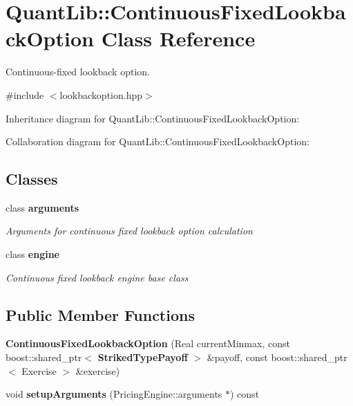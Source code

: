 \section{Quant\+Lib\+:\+:Continuous\+Fixed\+Lookback\+Option Class Reference}
\label{class_quant_lib_1_1_continuous_fixed_lookback_option}


Continuous-\/fixed lookback option.  




{\ttfamily \#include $<$lookbackoption.\+hpp$>$}



Inheritance diagram for Quant\+Lib\+:\+:Continuous\+Fixed\+Lookback\+Option\+:


Collaboration diagram for Quant\+Lib\+:\+:Continuous\+Fixed\+Lookback\+Option\+:
\subsection*{Classes}
\begin{DoxyCompactItemize}
\item 
class {\bf arguments}
\begin{DoxyCompactList}\small\item\em Arguments for continuous fixed lookback option calculation \end{DoxyCompactList}\item 
class {\bf engine}
\begin{DoxyCompactList}\small\item\em Continuous fixed lookback engine base class \end{DoxyCompactList}\end{DoxyCompactItemize}
\subsection*{Public Member Functions}
\begin{DoxyCompactItemize}
\item 
{\bfseries Continuous\+Fixed\+Lookback\+Option} (Real current\+Minmax, const boost\+::shared\+\_\+ptr$<$ {\bf Striked\+Type\+Payoff} $>$ \&payoff, const boost\+::shared\+\_\+ptr$<$ Exercise $>$ \&exercise)\label{class_quant_lib_1_1_continuous_fixed_lookback_option_aff0303b6898a163a289b8904b0d992d6}

\item 
void {\bfseries setup\+Arguments} (Pricing\+Engine\+::arguments $\ast$) const \label{class_quant_lib_1_1_continuous_fixed_lookback_option_af5f30ea7805edf6f8cfca1bad1d2df43}

\end{DoxyCompactItemize}
